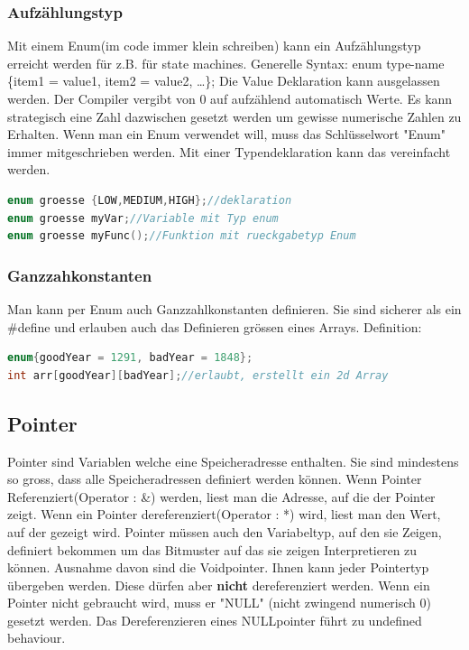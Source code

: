 \subsubsection{Aufzählungstyp}

Mit einem Enum(im code immer klein schreiben) kann ein Aufzählungstyp erreicht werden für z.B. für state machines. Generelle Syntax:\newline
enum type-name \{item1 = value1, item2 = value2, …\};\newline
Die Value Deklaration kann ausgelassen werden. Der Compiler vergibt von 0 auf aufzählend automatisch Werte. Es kann strategisch eine Zahl dazwischen gesetzt werden um gewisse numerische Zahlen zu Erhalten.\newline
Wenn man ein Enum verwendet will, muss das Schlüsselwort "Enum" immer mitgeschrieben werden. Mit einer Typendeklaration kann das vereinfacht werden. 

\begin{lstlisting}[language = c]
enum groesse {LOW,MEDIUM,HIGH};//deklaration
enum groesse myVar;//Variable mit Typ enum
enum groesse myFunc();//Funktion mit rueckgabetyp Enum
\end{lstlisting}

\subsubsection{Ganzzahkonstanten}

Man kann per Enum auch Ganzzahlkonstanten definieren. Sie sind sicherer als ein \#define und erlauben auch das Definieren grössen eines Arrays. Definition:

\begin{lstlisting}[language = c]
enum{goodYear = 1291, badYear = 1848};
int arr[goodYear][badYear];//erlaubt, erstellt ein 2d Array
\end{lstlisting}

\subsection{Pointer}

Pointer sind Variablen welche eine Speicheradresse enthalten. Sie sind mindestens so gross, dass alle Speicheradressen definiert werden können.\newline
Wenn Pointer Referenziert(Operator : \&) werden, liest man die Adresse, auf die der Pointer zeigt.\newline
Wenn ein Pointer dereferenziert(Operator : *) wird, liest man den Wert, auf der gezeigt wird.\newline 
Pointer müssen auch den Variabeltyp, auf den sie Zeigen, definiert bekommen um das Bitmuster auf das sie zeigen Interpretieren zu können. Ausnahme davon sind die Voidpointer. Ihnen kann jeder Pointertyp übergeben werden. Diese dürfen aber \textbf{nicht} dereferenziert werden.\newline
Wenn ein Pointer nicht gebraucht wird, muss er "NULL" (nicht zwingend numerisch 0) gesetzt werden. Das Dereferenzieren eines NULLpointer  führt zu undefined behaviour.\newline

